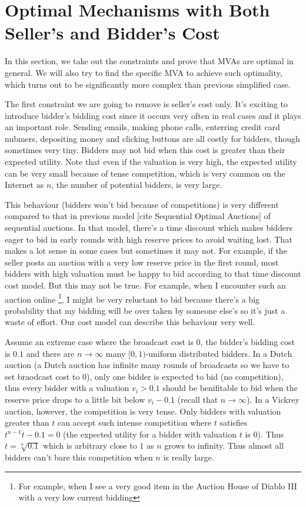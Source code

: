 \section{Optimal Mechanisms with Both Seller's and Bidder's Cost}

In this section, we take out the constraints and prove that MVAs are optimal in
general. We will also try to find the specific MVA to achieve such optimality,
which turns out to be significantly more complex than previous
simplified case.

The first constraint we are going to remove is seller's cost only.  It's
exciting to introduce bidder's bidding cost since it occurs very often in real
cases and it plays an important role.  Sending emails, making phone calls,
enterring credit card nubmers, depositing money and clicking buttons are all
costly for bidders, though sometimes very tiny.  Bidders may not bid when this
cost is greater than their expected utility. Note that even if the valuation is
very high, the expected utility can be very small because of tense competition,
which is very common on the Internet as $n$, the number of potential bidders,
is very large. 

This behaviour (bidders won't bid because of competitions) is very different
compared to that in previous model [cite Sequential Optimal Auctions] of
sequential auctions. In that model, there's a time discount which
makes bidders eager to bid in early rounds with high reserve prices to avoid
waiting lost. That makes a lot sense in some cases but sometimes it may not.
For example, if the seller posts an auction with a very low reserve price in
the first round, most bidders with high valuation must be happy to bid
according to that time discount cost model. But this may not be true. For
example, when I encounter such an auction online \footnote{For example, when I
see a very good item in the Auction House of Diablo III with a very low current
bidding}, I might be very reluctant to bid because there's a big probability
that my bidding will be over taken by someone else's so it's just a waste of
effort. Our cost model can describe this behaviour very well.

Assume an extreme case where the broadcast cost is $0$, the bidder's bidding
cost is $0.1$ and there are $n \rightarrow \infty$ many $[0, 1)$-uniform
distributed bidders. In a Dutch auction (a Dutch auction has infinite many
rounds of broadcasts so we have to set braodcast cost to $0$), only one bidder
is expected to bid (no competition), thus every bidder with a valuation $v_i
> 0.1$ should be benifitable to bid when the reserve price drops to a little
bit below $v_i-0.1$ (recall that $n \rightarrow \infty$).  In a Vickrey
auction, however, the competition is very tense. Only bidders with valuation
greater than $t$ can accept such intense competition where $t$ satisfies
$t^{n-1}t - 0.1 = 0$ (the expected utility for a bidder with valuation $t$ is
$0$).  Thus $t = \sqrt[n]{0.1}$ which is arbitrary close to $1$ as $n$ grows to
infinity.  Thus almost all bidders can't bare this competition when $n$ is
really large.

